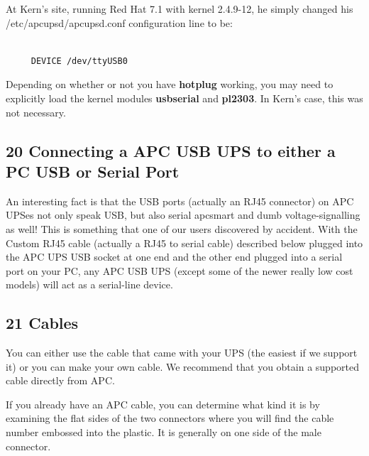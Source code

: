 {{{{{{{{{{At Kern's site, running Red Hat 7.1 with kernel 2.4.9-12, he simply changed
his /etc/apcupsd/apcupsd.conf configuration line to be: 

\footnotesize
\begin{verbatim}
     
     DEVICE /dev/ttyUSB0
\end{verbatim}
\normalsize

Depending on whether or not you have {\bf hotplug} working, you may need to
explicitly load the kernel modules {\bf usbserial} and {\bf pl2303}. In Kern's
case, this was not necessary. 

\label{Connecting-a-APC-USB-UPS-to-either-a-PC-USB-or-Serial-Port}

\subsection*{20 Connecting a APC USB UPS to either a PC USB or Serial Port}

An interesting fact is that the USB ports (actually an RJ45 connector) on APC
UPSes not only speak USB, but also serial apcsmart and dumb voltage-signalling
as well! This is something that one of our users discovered by accident. With
the Custom RJ45 cable (actually a RJ45 to serial cable) described below
plugged into the APC UPS USB socket at one end and the other end plugged into
a serial port on your PC, any APC USB UPS (except some of the newer really low
cost models) will act as a serial-line device. 

\label{Cables}

\subsection*{21 Cables}

\label{index-Cables-191}
You can either use the cable that came with your UPS (the easiest if we
support it) or you can make your own cable. We recommend that you obtain a
supported cable directly from APC.  

If you already have an APC cable, you can determine what kind it is by
examining the flat sides of the two connectors where you will find the cable
number embossed into the plastic. It is generally on one side of the male
connector.  

}}}}}}}}}}
